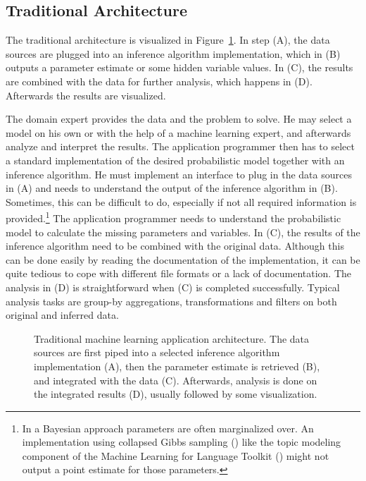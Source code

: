 \subsection{Traditional Architecture}

The traditional architecture is visualized in Figure~\ref{fig:ml-application-architecture}. In step (A), the data sources are plugged into an inference algorithm implementation, which in (B) outputs a parameter estimate or some hidden variable values. In (C), the results are combined with the data for further analysis, which happens in (D). Afterwards the results are visualized.

The domain expert provides the data and the problem to solve. He may select a model on his own or with the help of a machine learning expert, and afterwards analyze and interpret the results. The application programmer then has to select a standard implementation of the desired probabilistic model together with an inference algorithm. He must implement an interface to plug in the data sources in (A) and needs to understand the output of the inference algorithm in (B). Sometimes, this can be difficult to do, especially if not all required information is provided.\footnote{In a Bayesian approach parameters are often marginalized over. An implementation using collapsed Gibbs sampling (\cite{liu1994collapsed}) like the topic modeling component of the Machine Learning for Language Toolkit (\cite{mccallum2002mallet}) might not output a point estimate for those parameters.} The application programmer needs to understand the probabilistic model to calculate the missing parameters and variables. In (C), the results of the inference algorithm need to be combined with the original data. Although this can be done easily by reading the documentation of the implementation, it can be quite tedious to cope with different file formats or a lack of documentation. The analysis in (D) is straightforward when (C) is completed successfully. Typical analysis tasks are group-by aggregations, transformations and filters on both original and inferred data.

\begin{figure}[t]
\centering
\scalebox{\tikzScale}{\adjustTikzSize }
\caption[Traditional machine learning application architecture]{Traditional machine learning application architecture. The data sources are first piped into a selected inference algorithm implementation (A), then the parameter estimate is retrieved (B), and integrated with the data (C). Afterwards, analysis is done on the integrated results (D), usually followed by some visualization.}\label{fig:ml-application-architecture}
\end{figure}

